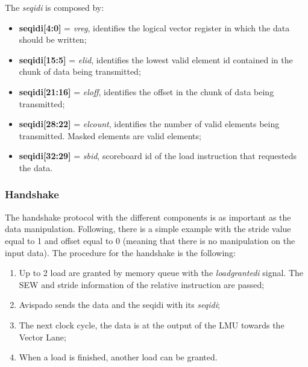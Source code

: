The \emph{seq\+id\+i} is composed by:
\begin{itemize}
    \item \textbf{seq\+id\+i[4:0]} = \textit{v\+reg}, identifies the logical vector register in which the data should be written;
    
    \item \textbf{seq\+id\+i[15:5]} = \textit{el\+id}, identifies the lowest valid element id contained in the chunk of data being transmitted;
    
    \item \textbf{seq\+id\+i[21:16]} = \textit{el\+off}, identifies the offset in the chunk of data being transmitted;
    
    \item \textbf{seq\+id\+i[28:22]} = \textit{el\+count}, identifies the number of valid elements being transmitted. Masked elements are valid elements; 
    
    \item \textbf{seq\+id\+i[32:29]} = \textit{sb\+id}, scoreboard id of the load instruction that requesteds the data.
\end{itemize}


\subsubsection{Handshake}
The handshake protocol with the different components is as important as the data manipulation. Following, there is a simple example with the stride value equal to 1 and offset equal to 0 (meaning that there is no manipulation on the input data).
The procedure for the handshake is the following:

\begin{enumerate}
    \item Up to 2 load are granted by memory queue with the \emph{load\+granted\+i} signal. The SEW and stride information of the relative instruction are passed;
    
    \item Avispado sends the data and the seq\+id\+i with its \emph{seq\+id\+i};
    
    \item The next clock cycle, the data is at the output of the LMU towards the Vector Lane;
    
    \item When a load is finished, another load can be granted.
\end{enumerate}

